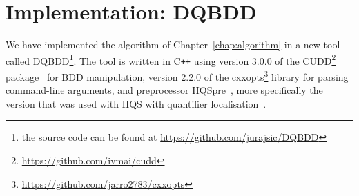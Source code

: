 \documentclass[
  digital, %
  color,
  twoside, %
  table,   %
  nolof,     %
  nolot,     %
]{fithesis3}
\theoremstyle{definition}
\theoremstyle{remark}
\newcommand{\vars}[1]{V_{#1}}
\newcommand{\prefix}[1]{Q({#1})}
\newcommand{\eprefix}[1]{Q_{\exists}(#1)}
\newcommand{\uprefix}[1]{Q_{\forall}(#1)}
\newcommand{\children}[1]{children({#1})}
\begin{document}
\begin{itemize}
\end{itemize}



\chapter{Implementation: DQBDD}
\label{chap:implementation}
\begin{sloppypar}
We have implemented the algorithm of Chapter~\ref{chap:algorithm} in a new tool called DQBDD\footnote{the source code can be found at \url{https://github.com/jurajsic/DQBDD}}. The tool is written in C\texttt{++} using version 3.0.0 of the CUDD\footnote{\url{https://github.com/ivmai/cudd}} package~\cite{CUDD} for BDD manipulation, version 2.2.0 of the cxxopts\footnote{\url{https://github.com/jarro2783/cxxopts}} library for parsing command-line arguments, and pre\-pro\-ces\-sor HQSpre~\cite{HQSpre2}, more specifically the version that was used with HQS with quantifier localisation~\cite{HQSquantifierLocalisation}.
\end{sloppypar}
\end{document}
